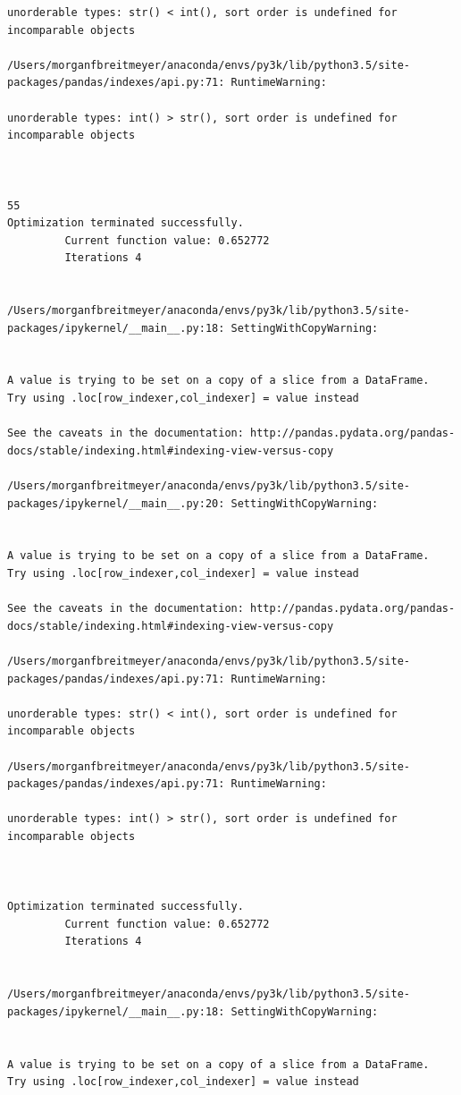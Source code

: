 \begin{lstlisting}
unorderable types: str() < int(), sort order is undefined for incomparable objects

/Users/morganfbreitmeyer/anaconda/envs/py3k/lib/python3.5/site-packages/pandas/indexes/api.py:71: RuntimeWarning:

unorderable types: int() > str(), sort order is undefined for incomparable objects



55
Optimization terminated successfully.
         Current function value: 0.652772
         Iterations 4


/Users/morganfbreitmeyer/anaconda/envs/py3k/lib/python3.5/site-packages/ipykernel/__main__.py:18: SettingWithCopyWarning:


A value is trying to be set on a copy of a slice from a DataFrame.
Try using .loc[row_indexer,col_indexer] = value instead

See the caveats in the documentation: http://pandas.pydata.org/pandas-docs/stable/indexing.html#indexing-view-versus-copy

/Users/morganfbreitmeyer/anaconda/envs/py3k/lib/python3.5/site-packages/ipykernel/__main__.py:20: SettingWithCopyWarning:


A value is trying to be set on a copy of a slice from a DataFrame.
Try using .loc[row_indexer,col_indexer] = value instead

See the caveats in the documentation: http://pandas.pydata.org/pandas-docs/stable/indexing.html#indexing-view-versus-copy

/Users/morganfbreitmeyer/anaconda/envs/py3k/lib/python3.5/site-packages/pandas/indexes/api.py:71: RuntimeWarning:

unorderable types: str() < int(), sort order is undefined for incomparable objects

/Users/morganfbreitmeyer/anaconda/envs/py3k/lib/python3.5/site-packages/pandas/indexes/api.py:71: RuntimeWarning:

unorderable types: int() > str(), sort order is undefined for incomparable objects



Optimization terminated successfully.
         Current function value: 0.652772
         Iterations 4


/Users/morganfbreitmeyer/anaconda/envs/py3k/lib/python3.5/site-packages/ipykernel/__main__.py:18: SettingWithCopyWarning:


A value is trying to be set on a copy of a slice from a DataFrame.
Try using .loc[row_indexer,col_indexer] = value instead


\end{lstlisting}
